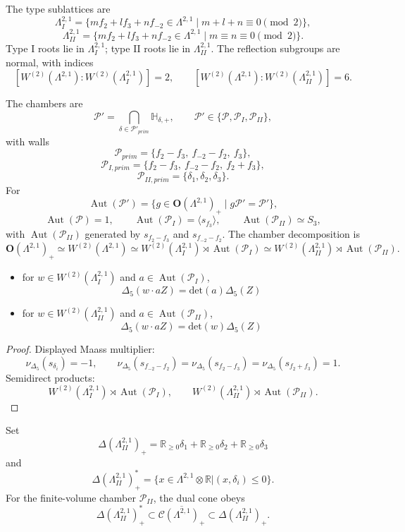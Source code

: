 \documentclass[11pt]{memoir}
\newcommand{\R}{\mathbb{R}} \newcommand{\La}{\Lambda}
\newcommand{\Orth}{\mathbf{O}}
\newcommand{\Hpl}{\mathbb{H}}
\newcommand{\Cone}{\mathcal{C}}
\newcommand{\Poly}{\mathcal{P}}
\newcommand{\Aut}{\operatorname{Aut}}
\begin{document}
The type sublattices are
$$\La^{2,1}_I=
\{mf_2+lf_3+nf_{-2}\in\La^{2,1}\mid m+l+n\equiv0\pmod2\},$$
$$\La^{2,1}_{II}=
\{mf_2+lf_3+nf_{-2}\in\La^{2,1}\mid m\equiv n\equiv0\pmod2\}.$$
Type I roots lie in $\La^{2,1}_I$; type II roots lie in
$\La^{2,1}_{II}$.  The reflection subgroups are normal, with indices
$$[W^{(2)}(\La^{2,1}):W^{(2)}(\La^{2,1}_I)]=2,\qquad
[W^{(2)}(\La^{2,1}):W^{(2)}(\La^{2,1}_{II})]=6.$$

The chambers are
$$\Poly'=\bigcap_{\delta\in\Poly'_{prim}}\Hpl_{\delta,+},
\qquad \Poly'\in\{\Poly,\Poly_I,\Poly_{II}\},$$
with walls
$$\Poly_{prim}=\{f_2-f_3,\ f_{-2}-f_2,\ f_3\},$$
$$\Poly_{I,prim}=\{f_2-f_3,\ f_{-2}-f_2,\ f_2+f_3\},$$
$$\Poly_{II,prim}=\{\delta_1,\delta_2,\delta_3\}.$$
For
$$\Aut(\Poly')=\{g\in\Orth(\La^{2,1})_+\mid g\Poly'=\Poly'\},$$
$$\Aut(\Poly)=1,\qquad
\Aut(\Poly_I)=\langle s_{f_3}\rangle,\qquad
\Aut(\Poly_{II})\simeq S_3,$$
with $\Aut(\Poly_{II})$ generated by
$s_{f_2-f_3}$ and $s_{f_{-2}-f_2}$.  The chamber decomposition is
$$\Orth(\La^{2,1})_+
\simeq W^{(2)}(\La^{2,1})
\simeq W^{(2)}(\La^{2,1}_I)\rtimes\Aut(\Poly_I)
\simeq W^{(2)}(\La^{2,1}_{II})\rtimes\Aut(\Poly_{II}).$$

\begin{lemma}
\begin{itemize}
  \item for $w \in W^{(2)}(\La^{2,1}_I)$ and $a \in \Aut(\Poly_{I})$,
  $$\Delta_5(w \cdot a Z) = \text{det}(a) \Delta_5(Z)$$
  \item for $w \in W^{(2)}(\La^{2,1}_{II})$ and $a \in \Aut(\Poly_{II})$,
  $$\Delta_5(w \cdot a Z) = \text{det}(w) \Delta_5(Z)$$
\end{itemize}

\end{lemma}
\begin{proof}
Displayed Maass multiplier:
$$\nu_{\Delta_5}(s_{\delta_i})=-1,\qquad
\nu_{\Delta_5}(s_{f_{-2}-f_2})
=\nu_{\Delta_5}(s_{f_2-f_3})
=\nu_{\Delta_5}(s_{f_2+f_3})=1.$$
Semidirect products:
$$W^{(2)}(\La^{2,1}_I)\rtimes\Aut(\Poly_I),\qquad
W^{(2)}(\La^{2,1}_{II})\rtimes\Aut(\Poly_{II}).$$
\end{proof}

Set
$$\Delta(\La^{2,1}_{II})_+
= \R_{\geq 0} \delta_1 + \R_{\geq 0} \delta_2
+ \R_{\geq 0} \delta_3$$
and
$$\Delta(\La^{2,1}_{II})_+^* = \{ x \in \La^{2,1} \otimes \R | (x,
\delta_i) \leq 0 \}.$$
For the finite-volume chamber $\Poly_{II}$, the dual cone obeys
$$\Delta(\La^{2,1}_{II})_+^* \subset
\overline{\Cone(\La^{2,1})_+} \subset  \Delta(\La^{2,1}_{II})_+.$$
\end{document}
